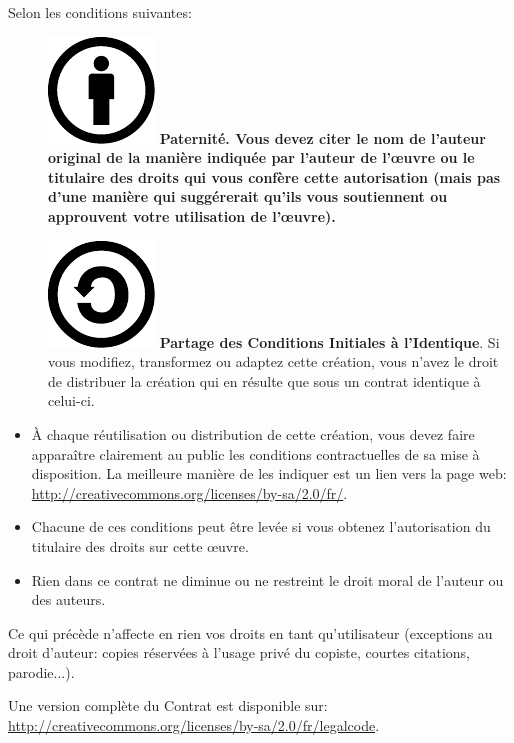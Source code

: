 \bigskip
Selon les conditions suivantes:
\begin{description}
\item[] \includegraphics[scale=0.2]{images/Cc-by_new.pdf}\bf{} Paternité\rm{}. Vous devez citer le nom de l'auteur original de la manière indiquée par l'auteur de l'œuvre ou le titulaire des droits qui vous confère cette autorisation (mais pas d'une manière qui suggérerait qu'ils vous soutiennent ou approuvent votre utilisation de l'œuvre).
\item[] \includegraphics[scale=0.2]{images/sa.pdf} \textbf{Partage des Conditions Initiales à l'Identique}. Si vous modifiez, transformez ou adaptez cette création, vous n'avez le droit de distribuer la création qui en résulte que sous un contrat identique à celui-ci.
\end{description}
\begin{itemize}
\item À chaque réutilisation ou distribution de cette création, vous devez faire apparaître clairement au public
les conditions contractuelles de sa mise à disposition. La meilleure manière de les indiquer est un lien vers la
 page web:\\
\url{http://creativecommons.org/licenses/by-sa/2.0/fr/}.

\item Chacune de ces conditions peut être levée si vous obtenez l'autorisation du titulaire des droits sur cette œuvre.
\item Rien dans ce contrat ne diminue ou ne restreint le droit moral de l'auteur ou des auteurs.
\end{itemize}

\bigskip
Ce qui précède n'affecte en rien vos droits en tant qu'utilisateur (exceptions au droit d'auteur: copies réservées à l'usage privé du copiste, courtes citations, parodie...).

Une version complète du Contrat est disponible sur:\\
\url{http://creativecommons.org/licenses/by-sa/2.0/fr/legalcode}.

\sommaire

